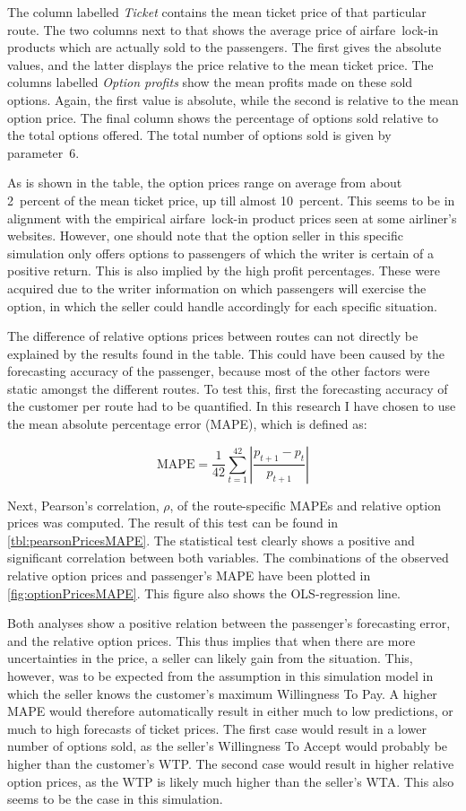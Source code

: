 The column labelled \emph{Ticket} contains the mean ticket price of that particular route. The two columns next to that shows the average price of airfare~lock-in products which are actually sold to the passengers. The first gives the absolute values, and the latter displays the price relative to the mean ticket price. The columns labelled \emph{Option profits} show the mean profits made on these sold options. Again, the first value is absolute, while the second is relative to the mean option price. The final column shows the percentage of options sold relative to the total options offered. The total number of options sold is given by parameter~6.

As is shown in the table, the option prices range on average from about 2~percent of the mean ticket price, up till almost 10~percent. This seems to be in alignment with the empirical airfare~lock-in product prices seen at some airliner's websites. However, one should note that the option seller in this specific simulation only offers options to passengers of which the writer is certain of a positive return. This is also implied by the high profit percentages. These were acquired due to the writer information on which passengers will exercise the option, in which the seller could handle accordingly for each specific situation.

The difference of relative options prices between routes can not directly be explained by the results found in the table. This could have been caused by the forecasting accuracy of the passenger, because most of the other factors were static amongst the different routes. To test this, first the forecasting accuracy of the customer per route had to be quantified. In this research I have chosen to use the mean absolute percentage error (MAPE), which is defined as:

$$\mbox{MAPE} = \frac{1}{42}\sum_{t=1}^{42} \left| \frac{p_{t+1}-p_t}{p_{t+1}}\right|$$

Next, Pearson's correlation, $\rho$, of the route-specific MAPEs and relative option prices was computed. The result of this test can be found in \autoref{tbl:pearsonPricesMAPE}. The statistical test clearly shows a positive and significant correlation between both variables. The combinations of the observed relative option prices and passenger's MAPE have been plotted in \autoref{fig:optionPricesMAPE}. This figure also shows the OLS-regression line.

Both analyses show a positive relation between the passenger's forecasting error, and the relative option prices. This thus implies that when there are more uncertainties in the price, a seller can likely gain from the situation. This, however, was to be expected from the assumption in this simulation model in which the seller knows the customer's maximum Willingness To Pay. A higher MAPE would therefore automatically result in either much to low predictions, or much to high forecasts of ticket prices. The first case would result in a lower number of options sold, as the seller's Willingness To Accept would probably be higher than the customer's WTP. The second case would result in higher relative option prices, as the WTP is likely much higher than the seller's WTA. This also seems to be the case in this simulation.

